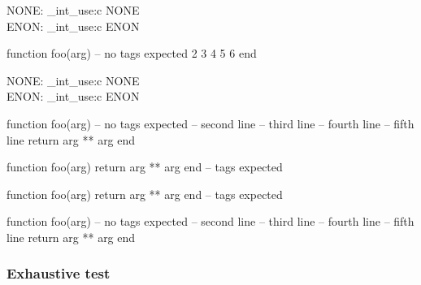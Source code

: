 \ExplSyntaxOn
NONE: \CDR_int_use:c { NONE } \\
ENON: \CDR_int_use:c { ENON } \\
\ExplSyntaxOff

\begin{CDRBlock}[
  stepnumber=1,
  firstnumber = auto,
]
function foo(arg) -- no tags expected
  2
  3
  4
  5
  6
end
\end{CDRBlock}
\ExplSyntaxOn
NONE: \CDR_int_use:c { NONE } \\
ENON: \CDR_int_use:c { ENON } \\
\ExplSyntaxOff

\begin{CDRBlock}[
  pygments,
  lang=lua,
  numbers=none,
  debug,
  show tags=none,
  only top=false,
]
function foo(arg) -- no tags expected
  -- second line
  -- third line
  -- fourth line
  -- fifth line
  return arg ** arg
end
\end{CDRBlock}


\begin{CDRBlock}[
  fontfamily=menlo,
  fontsize=\large,
  pygments=true,
  lang=lua,
  numbers=left,
  debug=true,
  show tags,
  only top=false
]
function foo(arg) return arg ** arg end -- tags expected
\end{CDRBlock}
\begin{CDRBlock}[
  tags={whatever it isp,we are the champions},
  fontfamily=menlo,
  fontsize=\large,
  pygments=true,
  lang=lua,
  numbers=left,
  debug=true,
  show tags,
  only top
]
function foo(arg) return arg ** arg end -- tags expected
\end{CDRBlock}
\begin{CDRBlock}[
  pygments,
  lang=lua,
  numbers=none,
  debug,
  showspaces,
  show tags=none,
  only top=false,
]
function foo(arg) -- no tags expected
  -- second line
  -- third line
  -- fourth line
  -- fifth line
  return arg ** arg
end
\end{CDRBlock}

\egroup

\subsubsection{Exhaustive test}

\bgroup

